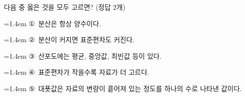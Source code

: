 다음 중 옳은 것을 모두 고르면? (정답 $2$개)
\par\medskip\par\noindent\hangindent=1.4em {\small ①}\ 분산은 항상 양수이다.\par\noindent\hangindent=1.4em {\small ②}\ 분산이 커지면 표준편차도 커진다.\par\noindent\hangindent=1.4em {\small ③}\ 산포도에는 평균, 중앙값, 최빈값 등이 있다.\par\noindent\hangindent=1.4em {\small ④}\ 표준편차가 작을수록 자료가 더 고르다.\par\noindent\hangindent=1.4em {\small ⑤}\ 대푯값은 자료의 변량이 흩어져 있는 정도를 하나의 수로 나타낸 값이다.\par\medskip
